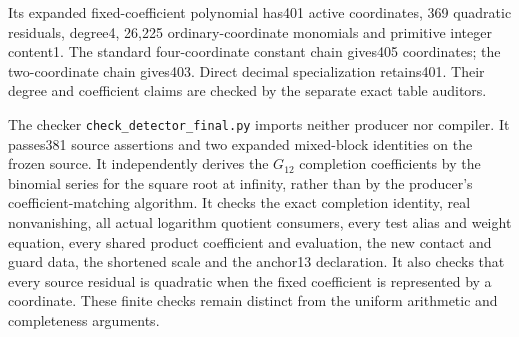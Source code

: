 Its expanded fixed-coefficient polynomial has401 active coordinates,
369 quadratic residuals, degree4, 26,225 ordinary-coordinate monomials
and primitive integer content1. The standard four-coordinate constant
chain gives405 coordinates; the two-coordinate chain gives403. Direct
decimal specialization retains401. Their degree and coefficient claims
are checked by the separate exact table auditors.

The checker \texttt{check\_detector\_final.py} imports neither producer
nor compiler. It passes381 source assertions and two expanded mixed-block
identities on the frozen source. It independently derives the $G_{12}$
completion coefficients by the binomial series for the square root at
infinity, rather than by the producer's coefficient-matching algorithm.
It checks the exact completion identity, real nonvanishing, all actual
logarithm quotient consumers, every test alias and weight equation,
every shared product coefficient and evaluation, the new contact and
guard data, the shortened scale and the anchor13 declaration. It also
checks that every source residual is quadratic when the fixed coefficient
is represented by a coordinate. These finite checks remain distinct
from the uniform arithmetic and completeness arguments.
